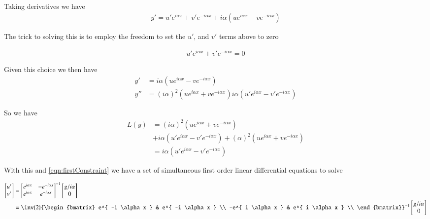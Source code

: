 \documentclass{article}
\begin{document}
Taking derivatives we have
\begin{align*}
y' = u' e^{ i \alpha x } + v' e^{ -i \alpha x } + i \alpha (u e^{ i \alpha x } - v e^{ -i \alpha x })
\end{align*}

The trick to solving this is to employ the freedom to set the $u'$, and $v'$ terms above to zero

\begin{align}\label{eqn:firstConstraint}
u' e^{ i \alpha x } + v' e^{ -i \alpha x } = 0 
\end{align}

Given this choice we then have
\begin{align*}
y' &= i \alpha (u e^{ i \alpha x } - v e^{ -i \alpha x }) \\
y'' &= 
(i \alpha)^2 (u e^{ i \alpha x } + v e^{ -i \alpha x }) 
i \alpha (u' e^{ i \alpha x } - v' e^{ -i \alpha x }) 
\end{align*}

So we have
\begin{align*}
L(y) 
&=
(i \alpha)^2 (u e^{ i \alpha x } + v e^{ -i \alpha x })  \\
&+i \alpha (u' e^{ i \alpha x } - v' e^{ -i \alpha x }) 
+ (\alpha)^2 (u e^{ i \alpha x } + v e^{ -i \alpha x })  \\
&=
i \alpha (u' e^{ i \alpha x } - v' e^{ -i \alpha x }) 
\end{align*}

With this and \ref{eqn:firstConstraint} we have a set of simultaneous first order linear differential equations to solve

\begin{align*}
\begin{bmatrix}
u' \\
v' \\
\end{bmatrix}
&=
{\begin{bmatrix}
 e^{ i \alpha x } &- e^{ -i \alpha x } \\
 e^{ i \alpha x } &  e^{ -i \alpha x } \\
\end{bmatrix}}^{-1}
\begin{bmatrix}
{g}/{i \alpha} \\
0 \\
\end{bmatrix} \\
&=
\inv{2}
{\begin{bmatrix}
 e^{ -i \alpha x } & e^{ -i \alpha x } \\
 -e^{ i \alpha x } &  e^{ i \alpha x } \\
\end{bmatrix}}^{-1}
\begin{bmatrix}
{g}/{i \alpha} \\
0 \\
\end{bmatrix} \\
\end{align*}



\end{document}
